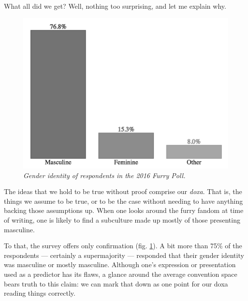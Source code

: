 What all did we get?  Well, nothing too surprising, and let me explain why.

\begin{figure}
  \centering
  \includegraphics[scale=0.45]{assets/identity.png}
  \caption{\textit{Gender identity of respondents in the 2016 Furry Poll.}}
  \label{fig:identity}
\end{figure}

The ideas that we hold to be true without proof comprise our \textit{doxa}.  That is, the things we assume to be true, or to be the case without needing to have anything backing those assumptions up.  When one looks around the furry fandom at time of writing, one is likely to find a subculture made up mostly of those presenting masculine.

To that, the survey offers only confirmation (fig. \ref{fig:identity}).  A bit more than 75\% of the respondents --- certainly a supermajority --- responded that their gender identity was masculine or mostly masculine.  Although one's expression or presentation used as a predictor has its flaws, a glance around the average convention space bears truth to this claim: we can mark that down as one point for our doxa reading things correctly.


